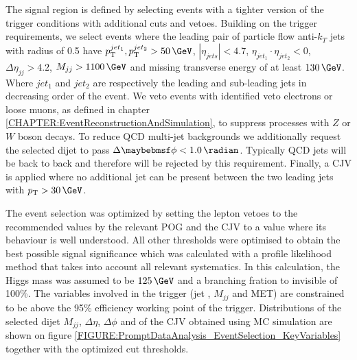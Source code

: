 The signal region is defined by selecting events with a tighter version of the trigger conditions with additional cuts and vetoes. Building on the trigger requirements, we select events where the leading pair of particle flow anti-$k_T$ jets with radius of 0.5 have $\pt^{jet_1},\pt^{jet_2} > 50\,\GeV$, $|\eta_{jets}| < 4.7$, $\eta_{jet_1} \cdot \eta_{jet_2} < 0$, $\Delta\eta_{jj}>4.2$, $M_{jj}>1100\,\GeV$ and missing transverse energy of at least $130\,\GeV$. Where $jet_1$ and $jet_2$ are respectively the leading and sub-leading jets in decreasing \pt order of the event. We veto events with identified veto electrons or loose muons, as defined in chapter \ref{CHAPTER:EventReconstructionAndSimulation}, to suppress processes with $Z$ or $W$ boson decays. To reduce \gls{QCD} multi-jet backgrounds we additionally request the selected dijet to pass $\Delta\phi < 1.0\,\radian$. Typically \gls{QCD} jets will be back to back and therefore will be rejected by this requirement. Finally, a \acrfull{CJV} is applied where no additional jet can be present between the two leading jets with $\pt > 30\,\GeV$.

The event selection was optimized by setting the lepton vetoes to the recommended values by the relevant \gls{POG} and the \gls{CJV} to a value where its behaviour is well understood. All other thresholds were optimised to obtain the best possible signal significance which was calculated with a profile likelihood method that takes into account all relevant systematics. In this calculation, the Higgs mass was assumed to be $125\,\GeV$ and a branching fration to invisible of 100\%. The variables involved in the trigger (jet \pt, $M_{jj}$ and \gls{MET}) are constrained to be above the 95\% efficiency working point of the trigger. Distributions of the selected dijet $M_{jj}$, $\Delta\eta$, $\Delta\phi$ and of the \gls{CJV} obtained using \gls{MC} simulation are shown on figure \ref{FIGURE:PromptDataAnalysis_EventSelection_KeyVariables} together with the optimized cut thresholds.


